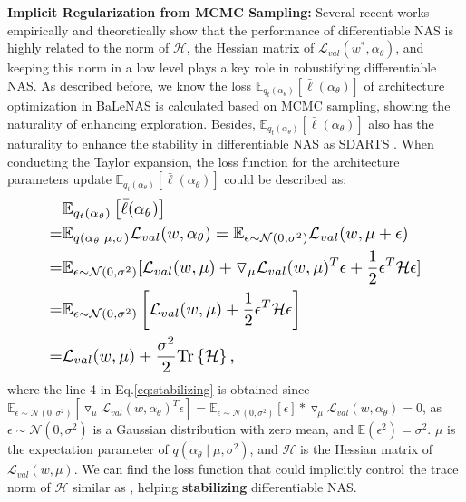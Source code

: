 \documentclass[10pt,twocolumn,letterpaper]{article}
\begin{document}
\vspace{1mm}
\noindent\textbf{Implicit Regularization from MCMC Sampling:}
Several recent works \cite{zela2019understanding,chen2020stabilizing,chen2020drnas} empirically and theoretically show that the performance of differentiable NAS is highly related to the norm of $\mathcal{H}$, the Hessian matrix of $\mathcal{L}_{val}(w^*,\alpha_{\theta})$, and keeping this norm in a low level plays a key role in robustifying differentiable NAS. As described before, we know the loss $\mathbb{E}_{q_t(\alpha_\theta)}\left [ \bar{\ell}(\alpha_\theta) \right ]$ of architecture optimization in BaLeNAS is calculated based on MCMC sampling, showing the naturality of enhancing exploration. Besides, $\mathbb{E}_{q_t(\alpha_\theta)}\left [ \bar{\ell}(\alpha_\theta) \right ]$ also has the naturality to enhance the stability in differentiable NAS as SDARTS \cite{chen2020stabilizing}. When conducting the Taylor expansion, the loss function for the architecture parameters update $\mathbb{E}_{q_t(\alpha_\theta)}\left [ \bar{\ell}(\alpha_\theta) \right ]$ could be described as: 
\begin{equation} \label{eq:stabilizing}
\resizebox{.85\linewidth}{!}{$
    \displaystyle
\begin{aligned}
&\mathbb{E}_{q_t(\alpha_\theta)}\left [ \bar{\ell}(\alpha_\theta) \right ]\\
=&\mathbb{E}_{q(\alpha_\theta \mid \mu,\sigma )} \mathcal{L}_{val}(w,\alpha_\theta)= \mathbb{E}_{\epsilon\sim \mathcal{N}(0,\sigma^2)}\mathcal{L}_{val}(w,\mu+\epsilon)\\
=&\mathbb{E}_{\epsilon\sim \mathcal{N}(0,\sigma^2)}[ \mathcal{L}_{val}(w,\mu)+\triangledown_{\mu}\mathcal{L}_{val}(w,\mu)^T\epsilon+\frac{1}{2} \epsilon^T \mathcal{H}\epsilon ]\\
=&\mathbb{E}_{\epsilon\sim \mathcal{N}(0,\sigma^2)}\left [\mathcal{L}_{val}(w,\mu)+\frac{1}{2}\epsilon^T\mathcal{H}\epsilon\right ]\\
=&\mathcal{L}_{val}(w,\mu)+\frac{\sigma^2}{2}\text{Tr}\left \{ \mathcal{H} \right \},
\end{aligned}
$}
\end{equation}
where the line 4 in Eq.\eqref{eq:stabilizing} is obtained since $\mathbb{E}_{\epsilon\sim \mathcal{N}(0,\sigma^2)}[\triangledown_{\mu} \mathcal{L}_{val}(w,\alpha_{\theta})^T\epsilon]=\mathbb{E}_{\epsilon\sim \mathcal{N}(0,\sigma^2)}[\epsilon]*\triangledown_{\mu} \mathcal{L}_{val}(w,\alpha_{\theta})=0$, as $\epsilon\sim\mathcal{N}(0,\sigma^2)$ is a Gaussian distribution with zero mean, and $\mathbb{E}(\epsilon^2)=\sigma^2$. $\mu$ is the expectation parameter of $q(\alpha_\theta \mid \mu,\sigma^2 )$, and $\mathcal{H}$ is the Hessian matrix of $\mathcal{L}_{val}(w,\mu)$. We can find the loss function that could implicitly control the trace norm of $\mathcal{H}$ similar as \cite{chen2020stabilizing,chen2020drnas}, helping \textbf{stabilizing} differentiable NAS.
\end{document}
